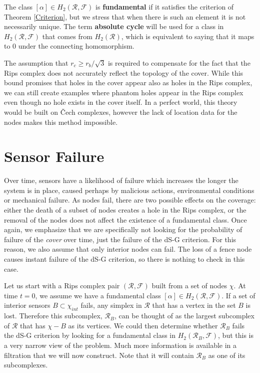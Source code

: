 \documentclass[10pt,twocolumn]{article} \usepackage{amsmath,epsf,amssymb,cite,pifont,amsthm, mathrsfs,epsfig,  bbm, amsthm,  setspace}
\newcommand{\FF}{\mathcal F}
\newcommand{\RR}{\mathcal R}
\renewcommand{\1}{\mathbbm{1}}
\newcommand{\Cech}{\v{C}ech }
\newcommand{\RF}{\mathcal{R},\mathcal{F}}
\begin{document}
The class $[\alpha] \in H_2(\RF)$ is \textbf{fundamental} if it satisfies the criterion of
Theorem \ref{Criterion},
but we stress that when there is such an element it is not necessarily unique.
The term \textbf{absolute cycle} will be used for a class in $H_2(\RF)$ that comes
from $H_2(\RR)$, which is equivalent to saying that it maps to $0$
under the connecting homomorphism.

The assumption that $r_c \geq r_b/\sqrt{3}$ is required to compensate for the fact that the Rips complex
does not accurately reflect the topology of the cover.
While this bound promises that holes in the cover appear also as holes in the Rips complex,
we can still create examples where phantom holes appear in the Rips complex even though no hole exists in the cover itself.
In a perfect world, this theory would be built on \Cech complexes,
however the lack of location data for the nodes makes this method impossible.







\section{Sensor Failure} \label{S: Sensor Failure}
Over time, sensors have a likelihood of failure which increases the longer the system is in place,
caused perhaps by malicious actions, environmental conditions or mechanical failure.
As nodes fail, there are two possible effects on the coverage:
either the death of a subset of nodes
creates a hole in the Rips complex,
or the removal of the nodes does not affect the existence of a fundamental class.
Once again, we emphasize
 that we are specifically not looking for the probability of failure of the \textit{cover}
over time, just the failure of the dS-G criterion.
For this reason, we also assume that only interior nodes can fail.
The loss of a fence node causes instant failure of the dS-G criterion,
so there is nothing to check in this case.

Let us start with a Rips complex pair $(\RR,\FF)$ built from a set of nodes $\chi$.
At time $t=0$, we assume we have a fundamental class $[\alpha] \in H_2(\RF)$.
If a set of interior sensors $B \subset \chi_{int}$ fails, any simplex in $\RR$
that has a vertex in the set $B$ is lost.
Therefore this subcomplex, $\RR_B$, can be thought of as the largest subcomplex of $\RR$ that has
 $\chi-B$ as its vertices.
We could then determine whether $\RR_B$ fails the dS-G criterion by looking for a fundamental class in
$H_2(\RR_B,\FF)$, but this is a very narrow view of the problem.
Much more information is available in a filtration that we will now construct.
Note that it will  contain $\RR_B$ as one of its subcomplexes.
\end{document}
